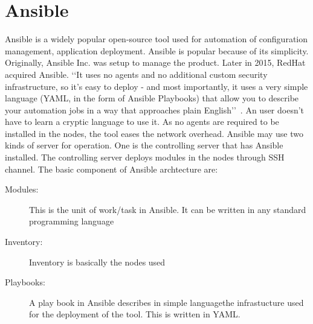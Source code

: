 \section{Ansible}
Ansible is a widely popular open-source tool used for automation of
configuration management, application deployment. Ansible is popular
because of its simplicity. Originally, Ansible Inc.  was setup to
manage the product. Later in 2015, RedHat acquired Ansible.
‘‘It uses no agents and no additional custom security infrastructure,
so it’s easy to deploy - and most importantly, it uses a very simple
language (YAML, in the form of Ansible Playbooks) that allow you to
describe your automation jobs in a way that approaches plain
English’’~\cite {hid-sp18-417-doc-Ansible}.
An user doesn’t have to learn a cryptic language to use it.  As no
agents are required to be installed in the nodes, the tool eases the
network overhead. Ansible may use two kinds of server for operation. One is the
controlling server that has Ansible installed.  The controlling server
deploys modules in the nodes through SSH channel.
The basic component of Ansible archtecture are: 
\begin{description}
\item[Modules:] This is the unit of work/task in Ansible. It
  can be written in any standard programming language
\item[Inventory:] Inventory is basically the nodes used
\item[Playbooks:] A play book in Ansible describes in simple
  languagethe infrastucture used for the deployment of the tool. This
  is written in YAML.
\end{description}
